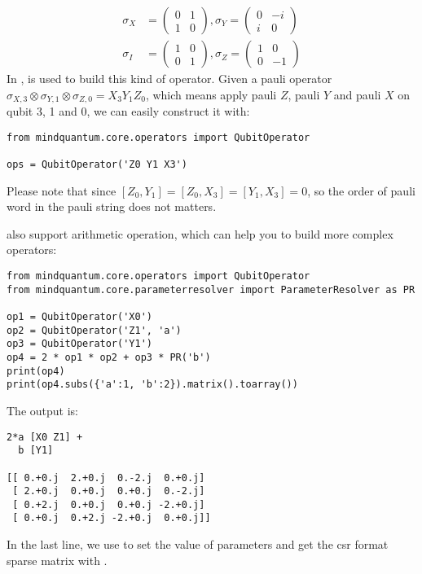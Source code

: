 \begin{align*}
    \sigma_X & = \begin{pmatrix}
                     0 & 1 \\
                     1 & 0
                 \end{pmatrix}, \sigma_Y = \begin{pmatrix}
                                               0 & -i \\
                                               i & 0
                                           \end{pmatrix} \\
    \sigma_I & =\begin{pmatrix}
                    1 & 0 \\
                    0 & 1
                \end{pmatrix}, \sigma_Z = \begin{pmatrix}
                                              1 & 0  \\
                                              0 & -1
                                          \end{pmatrix}
\end{align*}
In \MindQuantum, \QubitOperator is used to build this kind of operator. Given a pauli operator $\sigma_{X,3}\otimes \sigma_{Y,1}\otimes \sigma_{Z,0}=X_3 Y_1 Z_0$, which means apply pauli $Z$, pauli $Y$ and pauli $X$ on qubit 3, 1 and 0,  we can easily construct it with:

\begin{lstlisting}
from mindquantum.core.operators import QubitOperator

ops = QubitOperator('Z0 Y1 X3')
\end{lstlisting}
Please note that since $[Z_0, Y_1]= [Z_0,X_3] = [Y_1, X_3]=0$, so the order of pauli word in the pauli string does not matters.

\QubitOperator also support arithmetic operation, which can help you to build more complex operators:

\begin{lstlisting}
from mindquantum.core.operators import QubitOperator
from mindquantum.core.parameterresolver import ParameterResolver as PR

op1 = QubitOperator('X0')
op2 = QubitOperator('Z1', 'a')
op3 = QubitOperator('Y1')
op4 = 2 * op1 * op2 + op3 * PR('b')
print(op4)
print(op4.subs({'a':1, 'b':2}).matrix().toarray())
\end{lstlisting}
The output is:
\begin{lstlisting}
2*a [X0 Z1] +
  b [Y1]

[[ 0.+0.j  2.+0.j  0.-2.j  0.+0.j]
 [ 2.+0.j  0.+0.j  0.+0.j  0.-2.j]
 [ 0.+2.j  0.+0.j  0.+0.j -2.+0.j]
 [ 0.+0.j  0.+2.j -2.+0.j  0.+0.j]]
\end{lstlisting}
In the last line, we use  to set the value of parameters and get the csr format sparse matrix with .

